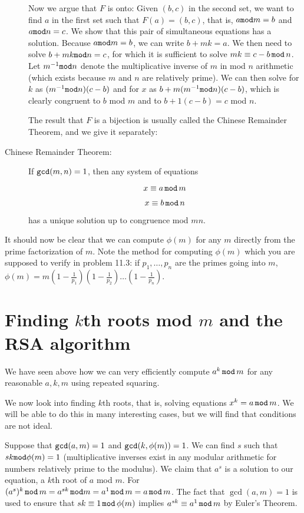 \documentclass[12pt]{article}
\begin{document}
\begin{description}
Now we argue that $F$ is onto:   Given $(b,c)$ in the second set, we want to find $a$ in the first set such that $F(a)=(b,c)$, that is, $a{\tt mod}m=b$ and $a{\tt mod}n=c$.   We show that this pair of simultaneous equations has a solution.
Because $a{\tt mod}m=b$, we can write $b+mk=a$.   We then need to solve $b+mk{\tt mod}n=c$, for which it is sufficient to solve $mk\equiv c-b\,{\tt mod}\,n$.   Let $m^{-1}{\tt mod}n$ denote the multiplicative inverse of $m$ in mod $n$ arithmetic (which exists because $m$ and $n$ are relatively prime).  We can then solve for $k$ as $(m^{-1}{\tt mod}n)(c-b)$ and for $x$ as $b+m(m^{-1}{\tt mod}n)(c-b)$, which is clearly congruent to $b$ mod $m$ and to $b+1(c-b)=c$ mod $n$.

The result that $F$ is a bijection is usually called the Chinese Remainder Theorem, and we give it separately:

\item[Chinese Remainder Theorem:]   If ${\tt gcd}(m,n)=1$, then any system of equations

$$x\equiv a\,{\tt mod}\,m$$

$$x \equiv b\,{\tt mod}\,n$$

has a unique solution up to congruence mod $mn$.

\end{description}

It should now be clear that we can compute $\phi(m)$ for any $m$ directly from the prime factorization of $m$.   Note the method for computing $\phi(m)$ which you are supposed to verify in problem 11.3:
if $p_1,\ldots,p_n$ are the primes going into $m$, $\phi(m)=m(1-\frac1{p_1})(1-\frac1{p_2})\ldots(1-\frac1{p_n})$.



\section{Finding $k$th roots mod $m$ and the RSA algorithm}

We have seen above how we can very efficiently compute $a^k\,{\tt mod}\,m$ for any reasonable $a,k,m$ using repeated squaring.

We now look into finding $k$th roots, that is, solving equations $x^k=a\,{\tt mod}\,m$.   We will be able to do this in many interesting cases, but we will find that conditions are not ideal.

Suppose that ${\tt gcd}(a,m)=1$ and ${\tt gcd}(k,\phi(m))=1$.   We can find $s$ such that $sk {\tt mod} \phi(m)=1$ (multiplicative inverses exist in any modular arithmetic for numbers relatively prime to the modulus).
We claim that $a^s$ is a solution to our equation, a $k$th root of $a$ mod $m$.   For $(a^s)^k \,{\tt mod}\,m=a^{sk} \, {\tt mod} m = a^1 \,{\tt mod}\, m = a \,{\tt mod}\, m$.   The fact that ${\gcd}(a,m)=1$
 is used to ensure that $sk\equiv 1\,{\tt mod}\,\phi(m)$ implies $a^{sk} \equiv a^1\,{\tt mod}\, m$ by Euler's Theorem.
\end{document}
